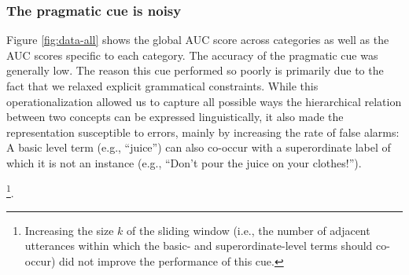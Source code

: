 \documentclass[english,,man,floatsintext]{apa6}
\begin{document}
\hypertarget{the-pragmatic-cue-is-noisy}{%
\subsubsection{The pragmatic cue is noisy}\label{the-pragmatic-cue-is-noisy}}

Figure \ref{fig:data-all} shows the global AUC score across categories as well as the AUC
scores specific to each category. The accuracy of the pragmatic cue was
generally low. The reason this cue performed so poorly is primarily due
to the fact that we relaxed explicit grammatical constraints. While this
operationalization allowed us to capture all possible ways the
hierarchical relation between two concepts can be expressed
linguistically, it also made the representation susceptible to errors,
mainly by increasing the rate of false alarms: A basic level term (e.g.,
\enquote{juice}) can also co-occur with a superordinate label of which it is
not an instance (e.g., \enquote{Don't pour the juice on your clothes!}).

\footnote{Increasing the size $k$ of the sliding window (i.e., the number
of adjacent utterances within which the basic- and superordinate-level
terms should co-occur) did not improve the performance of this cue.}.
\end{document}
